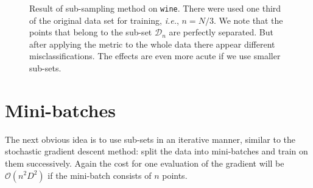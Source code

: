 \begin{figure}
  \centering
  \caption{Result of sub-sampling method on \texttt{wine}. There were used one
third of the original data set for training, \textit{i.e.}, $n = N/3$. We note
that the points that belong to the sub-set $\mathcal{D}_n$ are perfectly
separated. But after applying the metric to the whole data there appear
different misclassifications. The effects are even more acute if we use smaller
sub-sets.}
  \label{fig:sub-sampling}
\end{figure}

\section{Mini-batches}
\label{sec:mini-batches}

The next obvious idea is to use sub-sets in an iterative manner, similar to the
stochastic gradient descent method: split the data into mini-batches and train
on them successively. Again the cost for one evaluation of the gradient will be
$\mathcal{O}(n^2D^2)$ if the mini-batch consists of $n$ points.

